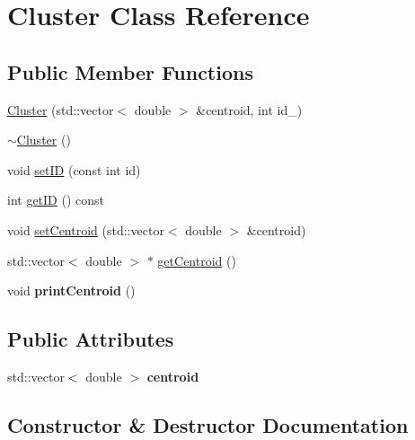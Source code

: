 \hypertarget{class_cluster}{}\section{Cluster Class Reference}
\label{class_cluster}
\subsection*{Public Member Functions}
\begin{DoxyCompactItemize}
\item 
\mbox{\hyperlink{class_cluster_a4ec85a16fc61148cfbde85525844c30a}{Cluster}} (std\+::vector$<$ double $>$ \&centroid, int id\+\_\+)
\item 
\mbox{\hyperlink{class_cluster_a4bddfc88ac859610acab15dd12851b58}{$\sim$\+Cluster}} ()
\item 
void \mbox{\hyperlink{class_cluster_a0b0965324db24dc6dae04873ecef7156}{set\+ID}} (const int id)
\item 
int \mbox{\hyperlink{class_cluster_a7e3843eaa486b9dd28de25a7c9f4e1f9}{get\+ID}} () const
\item 
void \mbox{\hyperlink{class_cluster_aec28970f0f25004db0e591032ad79d60}{set\+Centroid}} (std\+::vector$<$ double $>$ \&centroid)
\item 
std\+::vector$<$ double $>$ $\ast$ \mbox{\hyperlink{class_cluster_a6f53e148f46f17c27309d18645e60d5b}{get\+Centroid}} ()
\item 
\mbox{\label{class_cluster_aab54f4f732ea8e4219c863f459552fa6}} 
void {\bfseries print\+Centroid} ()
\end{DoxyCompactItemize}
\subsection*{Public Attributes}
\begin{DoxyCompactItemize}
\item 
\mbox{\label{class_cluster_a3c4f2ec424a29be86a6e79be1d3fab52}} 
std\+::vector$<$ double $>$ {\bfseries centroid}
\end{DoxyCompactItemize}


\subsection{Constructor \& Destructor Documentation}
\mbox{\label{class_cluster_a4ec85a16fc61148cfbde85525844c30a}} 

